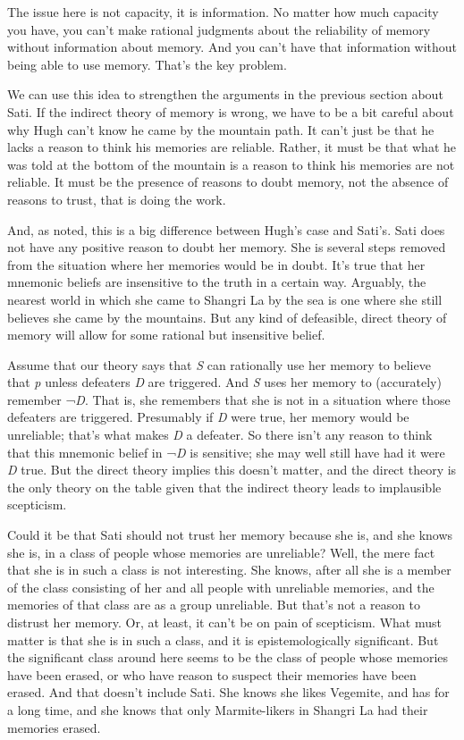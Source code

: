 \documentclass[
  11pt,
  letterpaper,
  DIV=11,
  numbers=noendperiod,
  twoside]{scrartcl}
\begin{document}
The issue here is not capacity, it is information. No matter how much
capacity you have, you can't make rational judgments about the
reliability of memory without information about memory. And you can't
have that information without being able to use memory. That's the key
problem.

We can use this idea to strengthen the arguments in the previous section
about Sati. If the indirect theory of memory is wrong, we have to be a
bit careful about why Hugh can't know he came by the mountain path. It
can't just be that he lacks a reason to think his memories are reliable.
Rather, it must be that what he was told at the bottom of the mountain
is a reason to think his memories are not reliable. It must be the
presence of reasons to doubt memory, not the absence of reasons to
trust, that is doing the work.

And, as noted, this is a big difference between Hugh's case and Sati's.
Sati does not have any positive reason to doubt her memory. She is
several steps removed from the situation where her memories would be in
doubt. It's true that her mnemonic beliefs are insensitive to the truth
in a certain way. Arguably, the nearest world in which she came to
Shangri La by the sea is one where she still believes she came by the
mountains. But any kind of defeasible, direct theory of memory will
allow for some rational but insensitive belief.

Assume that our theory says that \emph{S} can rationally use her memory
to believe that \emph{p} unless defeaters \emph{D} are triggered. And
\emph{S} uses her memory to (accurately) remember ¬\emph{D}. That is,
she remembers that she is not in a situation where those defeaters are
triggered. Presumably if \emph{D} were true, her memory would be
unreliable; that's what makes \emph{D} a defeater. So there isn't any
reason to think that this mnemonic belief in ¬\emph{D} is sensitive; she
may well still have had it were \emph{D} true. But the direct theory
implies this doesn't matter, and the direct theory is the only theory on
the table given that the indirect theory leads to implausible
scepticism.

Could it be that Sati should not trust her memory because she is, and
she knows she is, in a class of people whose memories are unreliable?
Well, the mere fact that she is in such a class is not interesting. She
knows, after all she is a member of the class consisting of her and all
people with unreliable memories, and the memories of that class are as a
group unreliable. But that's not a reason to distrust her memory. Or, at
least, it can't be on pain of scepticism. What must matter is that she
is in such a class, and it is epistemologically significant. But the
significant class around here seems to be the class of people whose
memories have been erased, or who have reason to suspect their memories
have been erased. And that doesn't include Sati. She knows she likes
Vegemite, and has for a long time, and she knows that only
Marmite-likers in Shangri La had their memories erased.
\end{document}
